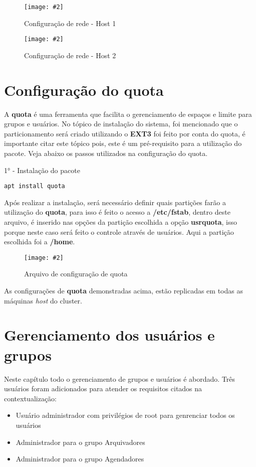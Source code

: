\documentclass[
	12pt,				%
	openany,			%
	a4paper,			%
	chapter=TITLE,		%
	section=TITLE,		%
	english,
	brazil				%
]{abntex2}
\newcommand{\includeImage}[3] {

\begin{figure}[H]
 	 \centering
  		\texttt{[image: \#2]}
  	\caption{#3}
\end{figure}

}
\begin{document}
\includeImage{0.5}{imgs/2_configuracao_rede/host/1_host_1.png}{Configuração de rede - Host 1}
\includeImage{0.5}{imgs/2_configuracao_rede/host/1_host_2.png}{Configuração de rede - Host 2}

\section{Configuração do quota}

A \textbf{quota} é uma ferramenta que facilita o gerenciamento de espaços e limite para grupos e usuários. No tópico de instalação do sistema, foi mencionado que o particionamento será criado utilizando o \textbf{EXT3} foi feito por conta do quota, é importante citar este tópico pois, este é um pré-requisito para a utilização do pacote. Veja abaixo os passos utilizados na configuração do quota. 

1° - Instalação do pacote

\begin{lstlisting}
apt install quota
\end{lstlisting}

Após realizar a instalação, será necessário definir quais partições farão a utilização do \textbf{quota}, para isso é feito o acesso a \textbf{/etc/fstab}, dentro deste arquivo, é inserido nas opções da partição escolhida a opção \textbf{usrquota}, isso porque neste caso será feito o controle através de usuários. Aqui a partição escolhida foi a \textbf{/home}.

\includeImage{0.5}{imgs/3_configuracao_quota/1.png}{Arquivo de configuração de quota}

As configurações de \textbf{quota} demonstradas acima, estão replicadas em todas as máquinas \textit{host} do cluster. 

\section{Gerenciamento dos usuários e grupos}

Neste capítulo todo o gerenciamento de grupos e usuários é abordado. Três usuários foram adicionados para atender os requisitos citados na contextualização:

\begin{itemize}
	\item Usuário administrador com privilégios de root para genrenciar todos os usuários
	\item Administrador para o grupo Arquivadores 
	\item Administrador para o grupo Agendadores
\end{itemize}
\end{document}
